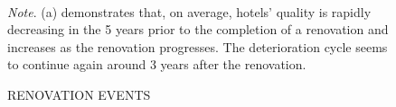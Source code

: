 \documentclass[mksc,blindrev]{informs3} %
\begin{document}


\begin{figure}[htp]
\caption{RENOVATION EVENTS}
 \centering
 \\
 
 \bigskip 
 \begin{flushleft}
\small
\textit{Note}. (a) demonstrates that, on average, hotels' quality is rapidly decreasing in the 5 years prior to the completion of a renovation and increases as the renovation progresses. The deterioration cycle seems to continue again around 3 years after the renovation. 
\end{flushleft}
  
\end{figure}
\clearpage
\end{document}
